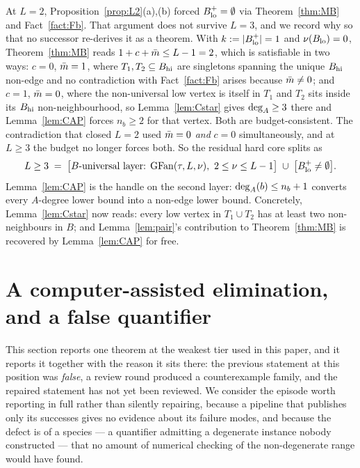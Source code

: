 \begin{remark}\label{rem:otherlayer}
At $L = 2$, Proposition~\ref{prop:L2}(a),(b) forced $B_{\mathrm{lo}}^{+} = \emptyset$ via
Theorem~\ref{thm:MB} and Fact~\ref{fact:Fb}. That argument does not survive $L = 3$, and we
record why so that no successor re-derives it as a theorem. With $k := |B_{\mathrm{lo}}^{+}| = 1$ and
$\nu(B_{\mathrm{lo}}) = 0$, Theorem~\ref{thm:MB} reads $1 + c + \bar{m} \le L - 1 = 2$, which is
satisfiable in two ways: $c = 0$, $\bar{m} = 1$, where $T_1,T_2 \subseteq B_{\mathrm{hi}}$ are singletons
spanning the unique $B_{\mathrm{hi}}$ non-edge and no contradiction with Fact~\ref{fact:Fb} arises
because $\bar{m} \ne 0$; and $c = 1$, $\bar{m} = 0$, where the non-universal low vertex is
itself in $T_1$ and $T_2$ sits inside its $B_{\mathrm{hi}}$ non-neighbourhood, so
Lemma~\ref{lem:Cstar} gives $\mathrm{deg}_A \ge 3$ there and Lemma~\ref{lem:CAP} forces $n_b \ge 2$
for that vertex. Both are budget-consistent. The contradiction that closed $L = 2$ used
$\bar{m} = 0$ \emph{and} $c = 0$ simultaneously, and at $L \ge 3$ the budget no longer forces
both. So the residual hard core splits as
\[
L \ge 3 \;=\; \bigl[\text{$B$-universal layer: } \mathrm{GFan}(\tau,L,\nu),\ 2 \le \nu \le L-1
\bigr] \;\cup\; \bigl[B_{\mathrm{lo}}^{+} \ne \emptyset\bigr].
\]
Lemma~\ref{lem:CAP} is the handle on the second layer: $\mathrm{deg}_A(b) \le n_b+1$ converts every
$A$-degree lower bound into a non-edge lower bound. Concretely, Lemma~\ref{lem:Cstar} now
reads: every low vertex in $T_1 \cup T_2$ has at least two non-neighbours in $B$; and
Lemma~\ref{lem:pair}'s contribution to Theorem~\ref{thm:MB} is recovered by
Lemma~\ref{lem:CAP} for free.
\end{remark}

\section{A computer-assisted elimination, and a false quantifier}\label{sec:gfannu}

This section reports one theorem at the weakest tier used in this paper, and it reports it
together with the reason it sits there: the previous statement at this position was
\emph{false}, a review round produced a counterexample family, and the repaired statement
has not yet been reviewed. We consider the episode worth reporting in full rather than
silently repairing, because a pipeline that publishes only its successes gives no evidence
about its failure modes, and because the defect is of a species --- a quantifier admitting a
degenerate instance nobody constructed --- that no amount of numerical checking of the
non-degenerate range would have found.

